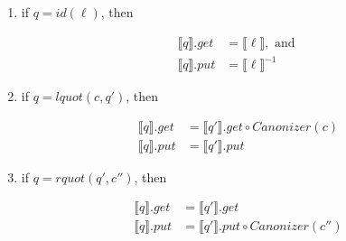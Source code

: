 \documentclass{svproc}
\begin{document}
\begin{enumerate}
  \item
  if $q = id(\ell)$, then
  \begin{prooftree}
\end{prooftree}
  \begin{align*}
  \llbracket q \rrbracket.get &=  \llbracket \ell \rrbracket, \text{ and }\\
  \llbracket q \rrbracket.put &= \llbracket \ell \rrbracket^{-1}
  \end{align*}
 
  \item if $q = lquot(c, q')$, then
\begin{prooftree}
\end{prooftree}
  \begin{align*}
  \llbracket q \rrbracket.get  &= \llbracket q'
  \rrbracket.get \circ Canonizer(c)\\
  \llbracket q \rrbracket.put &= \llbracket q' \rrbracket.put
  \end{align*}
  \item
  if $q = rquot(q', c'')$, then
  \begin{prooftree}
  
\end{prooftree}
  \begin{align*}
  \llbracket q \rrbracket.get &= \llbracket q'
  \rrbracket.get\\
  \llbracket q \rrbracket.put &= \llbracket q'
  \rrbracket.put \circ Canonizer(c'')
  \end{align*}
  

\end{enumerate}
\end{document}
